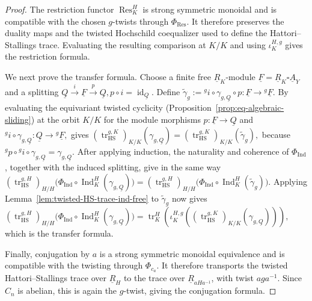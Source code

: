 \documentclass[11pt,oneside]{amsart}
\DeclareMathOperator{\tr}{tr}
\DeclareMathOperator{\id}{id}
\numberwithin{equation}{section}
\numberwithin{figure}{section}
\theoremstyle{plain}
\theoremstyle{definition}
\theoremstyle{remark}
\begin{document}
\begin{proof}
The restriction functor \(\operatorname{Res}_K^H\) is strong symmetric
monoidal and is compatible with the chosen \(g\)-twists through
\(\Phi_{\operatorname{Res}}\). It therefore preserves the duality maps
and the twisted Hochschild coequalizer used to define the
Hattori--Stallings trace. Evaluating the resulting comparison at \(K/K\)
and using \(\iota_K^{H,g}\) gives the restriction formula.

We next prove the transfer formula. Choose a finite free
\(\underline R_K\)-module
\(
\underline F=\underline R_K\square\underline A_Y
\)
and a splitting
\(
\underline Q\xrightarrow{i}\underline F
\xrightarrow{p}\underline Q, p\circ i=\id_{\underline Q}.
\)
Define
\(
\widetilde\gamma_g
:={}^{g}i\circ\gamma_{g,\underline Q}\circ p
\colon
\underline F\longrightarrow{}^g\underline F.
\)
By evaluating the equivariant twisted cyclicity (Proposition~\ref{prop:eq-algebraic-sliding}) at the orbit $K/K$ for the module morphisms
\(
p:\underline F\to\underline Q
\)
and
\(
{}^gi\circ\gamma_{g,\underline Q}:
\underline Q\to{}^g\underline F,
\)
gives
\(
(\tr_{\mathrm{HS}}^{g,K})_{K/K}(\gamma_{g,\underline Q})
=
(\tr_{\mathrm{HS}}^{g,K})_{K/K}(\widetilde\gamma_g),
\)
because
\(
{}^gp\circ{}^gi\circ\gamma_{g,\underline Q}
=\gamma_{g,\underline Q}.
\)
After applying induction, the naturality and coherence of
\(\Phi_{\operatorname{Ind}}\), together with the induced splitting,
give in the same way
\(
(\tr_{\mathrm{HS}}^{g,H})_{H/H}
\bigl(\Phi_{\operatorname{Ind}}\circ
\operatorname{Ind}_K^H(\gamma_{g,\underline Q})\bigr)
=
(\tr_{\mathrm{HS}}^{g,H})_{H/H}
\bigl(\Phi_{\operatorname{Ind}}\circ
\operatorname{Ind}_K^H(\widetilde\gamma_g)\bigr).
\)
Applying Lemma~\ref{lem:twisted-HS-trace-ind-free} to
\(\widetilde\gamma_g\) now gives
\(
(\tr_{\mathrm{HS}}^{g,H})_{H/H}
\bigl(\Phi_{\operatorname{Ind}}\circ
\operatorname{Ind}_K^H(\gamma_{g,\underline Q})\bigr)=
\tr_K^H\left(
\iota_K^{H,g}\left(
(\tr_{\mathrm{HS}}^{g,K})_{K/K}
(\gamma_{g,\underline Q})
\right)\right),
\)
which is the transfer formula.

Finally, conjugation by \(a\) is a strong symmetric monoidal
equivalence and is compatible with the twisting through
\(\Phi_{c_a}\). It therefore transports the twisted
Hattori--Stallings trace over \(\underline R_H\) to the trace over
\(\underline R_{aHa^{-1}}\), with twist \(aga^{-1}\). Since \(C_n\) is
abelian, this is again the \(g\)-twist, giving the conjugation formula.
\end{proof}
\end{document}

